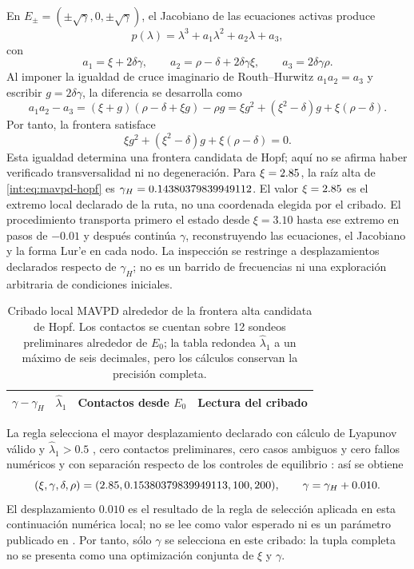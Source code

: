 En $E_\pm=(\pm\sqrt{\gamma},0,\pm\sqrt{\gamma})$, el Jacobiano de las
ecuaciones activas produce
\begin{equation}
 p(\lambda)=\lambda^3+a_1\lambda^2+a_2\lambda+a_3,
 \label{int:eq:mavpd-characteristic}
\end{equation}
con
\begin{equation}
 a_1=\xi+2\delta\gamma,\qquad
 a_2=\rho-\delta+2\delta\gamma\xi,\qquad
 a_3=2\delta\gamma\rho.
 \label{int:eq:mavpd-routh-coefficients}
\end{equation}
Al imponer la igualdad de cruce imaginario de Routh--Hurwitz
$a_1a_2=a_3$ y escribir \(g=2\delta\gamma\), la diferencia se desarrolla como
\[
 a_1a_2-a_3=(\xi+g)(\rho-\delta+\xi g)-\rho g
 =\xi g^2+(\xi^2-\delta)g+\xi(\rho-\delta).
\]
Por tanto, la frontera satisface
\begin{equation}
 \xi g^2+(\xi^2-\delta)g+\xi(\rho-\delta)=0.
 \label{int:eq:mavpd-hopf}
\end{equation}
Esta igualdad determina una frontera candidata de Hopf; aquí no se afirma
haber verificado transversalidad ni no degeneración. Para
$\xi=2.85$, la raíz alta de \eqref{int:eq:mavpd-hopf} es
$\gamma_H=0.14380379839949112$. El valor $\xi=2.85$ es el extremo local
declarado de la ruta, no una coordenada elegida por el cribado. El procedimiento
transporta primero el estado desde $\xi=3.10$ hasta ese extremo en pasos de
$-0.01$ y después continúa
$\gamma$, reconstruyendo las ecuaciones, el Jacobiano y la forma Lur'e en cada
nodo. La inspección se restringe a desplazamientos declarados respecto de
$\gamma_H$; no es un barrido de frecuencias ni una exploración arbitraria de
condiciones iniciales.

\ifHAFOBasinMaterial
\begin{table}[H]
\centering
\caption{Cribado local MAVPD alrededor de la frontera alta candidata de Hopf. Los
contactos se cuentan sobre 12 sondeos preliminares alrededor de $E_0$; la tabla
redondea $\widehat\lambda_1$ a un máximo de seis decimales, pero los cálculos
conservan la precisión completa.}
\label{int:tab:mavpd-chaos-screen}
\small
\begin{tabular}{@{}C{1.8cm}C{2.0cm}C{2.3cm}L{8.7cm}@{}}
\toprule
$\gamma-\gamma_H$ & $\widehat\lambda_1$ & Contactos desde $E_0$ & Lectura del cribado \\
\midrule

\end{tabular}
\end{table}
\fi

La regla selecciona el mayor desplazamiento declarado con cálculo de Lyapunov
válido y $\widehat\lambda_1>0.5$
\ifHAFOBasinMaterial
, cero contactos preliminares, cero casos ambiguos y cero fallos numéricos
\else
y con separación respecto de los controles de equilibrio
\fi
: así se obtiene
\[
 (\xi,\gamma,\delta,\rho)=
 (2.85,0.15380379839949113,100,200),\qquad
 \gamma=\gamma_H+0.010.
\]
El desplazamiento $0.010$ es el resultado de la regla de selección aplicada en
esta continuación numérica local; no se lee como valor esperado ni es un
parámetro publicado en \cite{matouk2023}. Por tanto, sólo $\gamma$ se selecciona
en este cribado: la tupla completa no se presenta como una optimización conjunta
de $\xi$ y $\gamma$.

